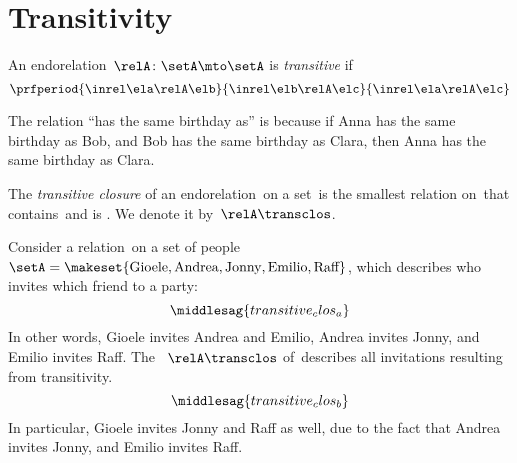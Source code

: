 
\section{Transitivity}

\begin{ctdefinition}
    \label{def:endo_transitive}
    An endorelation~$\relA\colon \setA\mto \setA$ is \emph{transitive} if
    \begin{equation}\label{eq:transitive}
        \prfperiod{
            \inrel \ela \relA \elb
        }{
            \inrel \elb \relA \elc
        }{
            \inrel \ela \relA \elc
        }
    \end{equation}
\end{ctdefinition}

\begin{example}
    The relation ``has the same birthday as'' is  because if Anna has the same birthday as Bob, and Bob has the same birthday as Clara, then Anna has the same birthday as Clara.
\end{example}

\begin{ctdefinition}
    \label{def:transitive-closure}
    The \emph{transitive closure} of an endorelation~\relA on a set~\setA is the smallest relation on~\setA that contains~\relA and is .
    We denote it by~$\relA\transclos$.
\end{ctdefinition}


\begin{example}
    \label{exa:party}
    Consider a relation~\relA on a set of people~$\setA=\makeset{\text{Gioele}, \text{Andrea}, \text{Jonny}, \text{Emilio}, \text{Raff}}$, which describes who invites which friend to a party:
    \begin{equation}
        \label{eq:transitive_clos_a}
        \middlesag{transitive_clos_a}
    \end{equation}
    In other words, Gioele invites Andrea and Emilio, Andrea invites Jonny, and Emilio invites Raff.
    The ~$\relA\transclos$ of~\relA describes all invitations resulting from transitivity.
    \begin{equation}
        \label{eq:transitive_clos_b}
        \middlesag{transitive_clos_b}
    \end{equation}
    In particular, Gioele invites Jonny and Raff as well, due to the fact that Andrea invites Jonny, and Emilio invites Raff.
\end{example}

